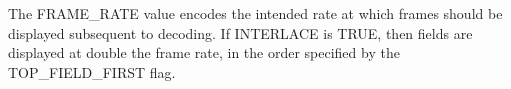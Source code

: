 The FRAME\_RATE value encodes the intended rate at which frames should be
displayed subsequent to decoding. If INTERLACE is TRUE, then fields are
displayed at double the frame rate, in the order specified by the
TOP\_FIELD\_FIRST flag.

